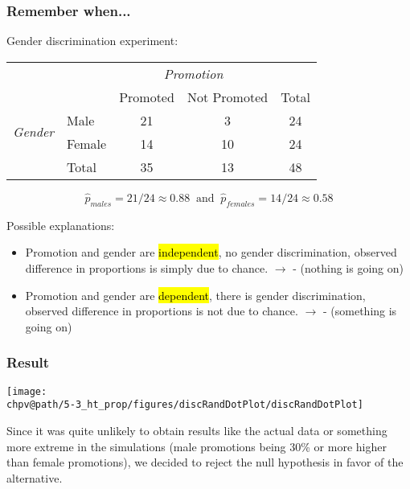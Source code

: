 \documentclass[t,compress,mathserif]{beamer}
\makeatletter
\def\chpv@path{../../Chp 5}
\makeatother
\begin{document}
\begin{frame}
\frametitle{Remember when...}

Gender discrimination experiment:

{\footnotesize
\begin{tabular}{ll  cc c} 
  		&				& \multicolumn{2}{c}{\textit{Promotion}} \\
\cline{3-4}
							&			& Promoted	& Not Promoted 	& Total	\\
\cline{2-5}
\multirow{2}{*}{\textit{Gender	}}	&Male 		& 21	 	& 3		& 24 	\\
							&Female		& 14	 	& 10 	 	& 24 \\
\cline{2-5}
							&Total		& 35		& 13		& 48 \\
\end{tabular}
}

\pause

\[ \hat{p}_{males} = 21 / 24 \approx 0.88 ~ \text{ and } ~ \hat{p}_{females} = 14 / 24 \approx 0.58 \]

\pause

Possible explanations:
\begin{itemize}
\item Promotion and gender are \hl{independent}, no gender discrimination, observed difference in proportions is simply due to chance. $\rightarrow$  - {\small (nothing is going on)}
\item Promotion and gender are \hl{dependent}, there is gender discrimination, observed difference in proportions is not due to chance. $\rightarrow$  - {\small (something is going on)}

\end{itemize}

\end{frame}


\begin{frame}
\frametitle{Result}

\begin{center}
\texttt{[image: \\chpv@path/5-3\_ht\_prop/figures/discRandDotPlot/discRandDotPlot]}
\end{center}

\pause

Since it was quite unlikely to obtain results like the actual data or something more extreme in the simulations (male promotions being 30\% or more higher than female promotions), we decided to reject the null hypothesis in favor of the alternative.

\end{frame}
\end{document}

